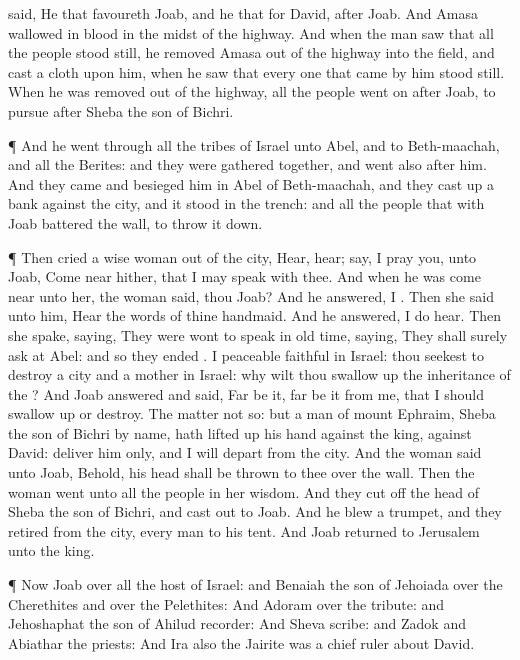 {said,
He that
favoureth
Joab, and he that
{} for
David,
{}
after
Joab.
And
Amasa
wallowed in
blood in the
midst of the
highway. And when the
man
saw that all the
people stood
still, he
removed
Amasa out of the
highway into the
field, and
cast a
cloth upon him, when he
saw that every one that
came by him stood
still.
When he was
removed out of the
highway, all the
people went
on
after
Joab, to
pursue
after
Sheba the
son of
Bichri.
\par }{\PP {}¶ And he
went through all the
tribes of
Israel unto
Abel, and to
Beth-maachah, and all the
Berites: and they were gathered
together, and
went also
after him.
And they
came and
besieged him in
Abel of
Beth-maachah, and they cast
up a
bank against the
city, and it
stood in the
trench: and all the
people that
{} with
Joab
battered the
wall, to throw it
down.
\par }{\PP {}¶ Then
cried a
wise
woman out of the
city,
Hear,
hear;
say, I pray you, unto
Joab, Come
near hither, that I may
speak with thee.
And when he was come
near unto her, the
woman
said,
{} thou
Joab? And he
answered, I
{}. Then she
said unto him,
Hear the
words of thine
handmaid. And he
answered, I do
hear.
Then she
spake,
saying, They were
wont to
speak in old
time,
saying, They shall
surely
ask
{} at
Abel: and so they
ended
{}.
I
{}
peaceable
{}
faithful in
Israel: thou
seekest to
destroy a
city and a
mother in
Israel: why wilt thou swallow
up the
inheritance of the
{}?
And
Joab
answered and
said, Far be
it, far be
it from me, that I should swallow
up or
destroy.
The
matter
{} not so: but a
man of
mount
Ephraim,
Sheba the
son of
Bichri by
name, hath lifted
up his
hand against the
king,
{} against
David:
deliver him only, and I will
depart from the
city. And the
woman
said unto
Joab, Behold, his
head shall be
thrown to thee
over the
wall.
Then the
woman
went unto all the
people in her
wisdom. And they cut
off the
head of
Sheba the
son of
Bichri, and
cast
{} out to
Joab. And he
blew a
trumpet, and they
retired from the
city, every
man to his
tent. And
Joab
returned to
Jerusalem unto the
king.
\par }{\PP {}¶ Now
Joab
{} over all the
host of
Israel: and
Benaiah the
son of
Jehoiada
{} over the
Cherethites and over the
Pelethites:
And
Adoram
{} over the
tribute: and
Jehoshaphat the
son of
Ahilud
{}
recorder:
And
Sheva
{}
scribe: and
Zadok and
Abiathar
{} the
priests:
And
Ira also the
Jairite was a chief
ruler about
David.

}

